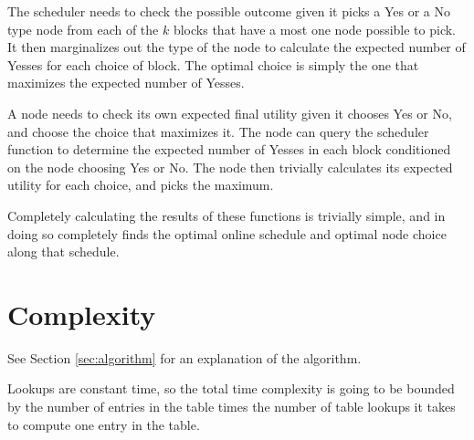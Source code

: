 \documentclass{article}
\begin{document}
The scheduler needs to check the possible outcome given it picks a Yes
or a No type node from each of the $k$ blocks that have a most one
node possible to pick. It then marginalizes out the type of the node
to calculate the expected number of Yesses for each choice of
block. The optimal choice is simply the one that maximizes the
expected number of Yesses.

A node needs to check its own expected final utility given it chooses
Yes or No, and choose the choice that maximizes it. The node can query
the scheduler function to determine the expected number of Yesses in
each block conditioned on the node choosing Yes or No. The node then
trivially calculates its expected utility for each choice, and picks
the maximum.

Completely calculating the results of these functions is trivially
simple, and in doing so completely finds the optimal online schedule
and optimal node choice along that schedule.

\section{Complexity}

See Section \ref{sec:algorithm} for an explanation of the algorithm.

Lookups are constant time, so the total time complexity is going to
be bounded by the number of entries in the table times the number of
table lookups it takes to compute one entry in the table.
\end{document}
